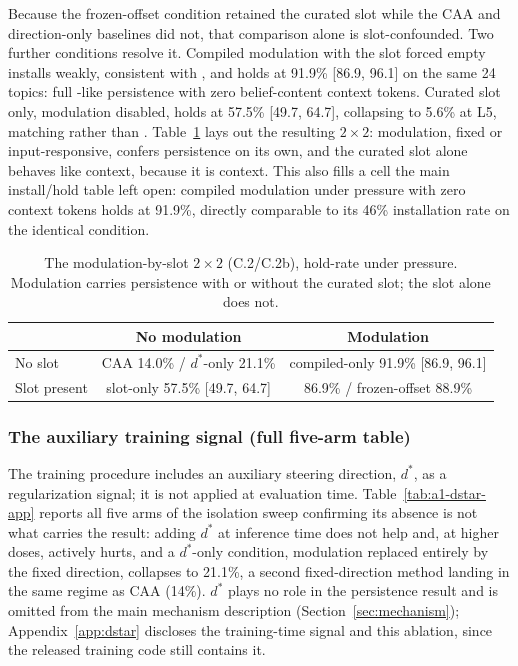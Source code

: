 Because the frozen-offset condition retained the curated slot while the CAA and
direction-only baselines did not, that comparison alone is slot-confounded. Two further
conditions resolve it. Compiled modulation with the slot forced
empty installs weakly, consistent with \condC{}, and holds at 91.9\% [86.9, 96.1] on the
same 24 topics: full \condF{}-like persistence with zero belief-content context tokens.
Curated slot only, modulation disabled, holds at 57.5\% [49.7, 64.7], collapsing to 5.6\%
at L5, matching \condB{} rather than \condF{}. Table~\ref{tab:mechanism-2x2-app} lays
out the resulting \(2\times2\): modulation, fixed or input-responsive, confers
persistence on its own, and the curated slot alone behaves like context, because it is
context. This also fills a cell the main install/hold table left open: compiled
modulation under pressure with zero context tokens holds at 91.9\%, directly comparable
to its 46\% installation rate on the identical condition.

\begin{table}[h]
\centering
\caption{The modulation-by-slot \(2\times2\) (C.2/C.2b), hold-rate under pressure.
Modulation carries persistence with or without the curated slot; the slot alone does
not.}
\label{tab:mechanism-2x2-app}
\begin{tabular}{lcc}
\toprule
& No modulation & Modulation \\
\midrule
No slot & CAA 14.0\% / \(d^*\)-only 21.1\% & compiled-only 91.9\% [86.9, 96.1] \\
Slot present & slot-only 57.5\% [49.7, 64.7] & \condF{} 86.9\% / frozen-offset 88.9\% \\
\bottomrule
\end{tabular}
\end{table}

\subsubsection{The auxiliary training signal (full five-arm table)}

The training procedure includes an auxiliary steering direction, \(d^*\), as a
regularization signal; it is not applied at evaluation time. Table~\ref{tab:a1-dstar-app}
reports all five arms of the isolation sweep confirming its absence is not what carries
the result: adding \(d^*\) at inference time does not help and, at higher doses, actively
hurts, and a \(d^*\)-only condition, modulation replaced entirely by the fixed direction,
collapses to 21.1\%, a second fixed-direction method landing in the same regime as CAA
(14\%). \(d^*\) plays no role in the persistence result and is omitted
from the main mechanism description (Section~\ref{sec:mechanism}); Appendix~\ref{app:dstar}
discloses the training-time signal and this ablation, since the released training code
still contains it.

